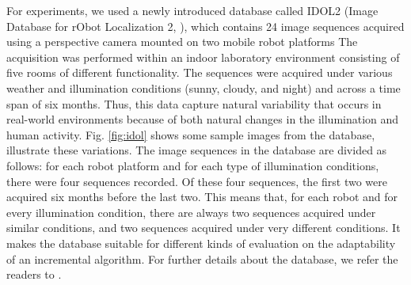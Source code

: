 For experiments, we used a newly introduced database called IDOL2 
(Image Database for rObot Localization 2, \cite{luo:idol2}), 
which contains 24 image sequences acquired using a perspective
camera mounted on two mobile robot platforms The acquisition was
performed within an indoor laboratory environment consisting of five 
rooms of different functionality. The sequences were acquired under
various weather and illumination conditions (sunny, cloudy, and night)
and across a time span of six months. Thus, this data capture
natural variability that occurs in real-world environments because of both 
natural changes in the illumination and human activity. Fig. \ref{fig:idol} 
shows some sample images from the database, illustrate these variations.
The image sequences in the database are divided as
follows: for each robot platform and for each type of illumination conditions, 
there were
four sequences recorded. Of these four sequences, the first two were 
acquired six months
before the last two. This means that, for each robot and for every 
illumination condition,
there are always two sequences acquired under similar conditions, and two 
sequences acquired
under very different conditions. It makes the database suitable for 
different kinds of
evaluation on the adaptability of an incremental algorithm. 
For further details about the
database, we refer the readers to \cite{luo:idol2}.

